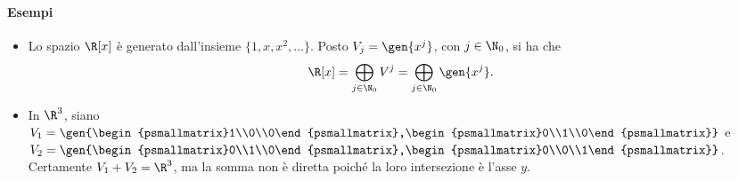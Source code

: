 \paragraph{Esempi}
\begin{itemize}
	\item Lo spazio $\R[x]$ è generato dall'insieme $\{1,x,x^2,\dots\}$.
		Posto $V_j=\gen{x^j}$, con $j\in\N_0$, si ha che
		\begin{equation*}
			\R[x]=\bigoplus_{j\in\N_0}V^j=\bigoplus_{j\in\N_0}\gen{x^j}.
		\end{equation*}
	\item In $\R^3$, siano $V_1=\gen{\begin{psmallmatrix}1\\0\\0\end{psmallmatrix},\begin{psmallmatrix}0\\1\\0\end{psmallmatrix}}$ e $V_2=\gen{\begin{psmallmatrix}0\\1\\0\end{psmallmatrix},\begin{psmallmatrix}0\\0\\1\end{psmallmatrix}}$.
		Certamente $V_1+V_2=\R^3$, ma la somma non è diretta poiché la loro intersezione è l'asse $y$.
\end{itemize}


